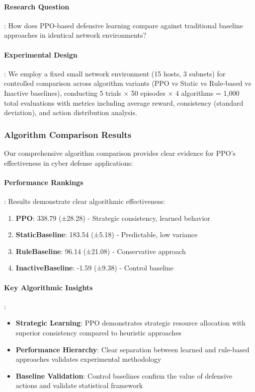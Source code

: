 \documentclass[12pt,oneside]{article}
\begin{document}
\paragraph{Research Question}: How does PPO-based defensive learning compare against traditional baseline approaches in identical network environments?

\paragraph{Experimental Design}: We employ a fixed small network environment (15 hosts, 3 subnets) for controlled comparison across algorithm variants (PPO vs Static vs Rule-based vs Inactive baselines), conducting 5 trials × 50 episodes × 4 algorithms = 1,000 total evaluations with metrics including average reward, consistency (standard deviation), and action distribution analysis.

\subsubsection{Algorithm Comparison Results}

Our comprehensive algorithm comparison provides clear evidence for PPO's effectiveness in cyber defense applications:

\paragraph{Performance Rankings}: Results demonstrate clear algorithmic effectiveness:
\begin{enumerate}
\item \textbf{PPO}: 338.79 (±28.28) - Strategic consistency, learned behavior  
\item \textbf{StaticBaseline}: 183.54 (±5.18) - Predictable, low variance
\item \textbf{RuleBaseline}: 96.14 (±21.08) - Conservative approach
\item \textbf{InactiveBaseline}: -1.59 (±9.38) - Control baseline
\end{enumerate}

\paragraph{Key Algorithmic Insights}:
\begin{itemize}
\item \textbf{Strategic Learning}: PPO demonstrates strategic resource allocation with superior consistency compared to heuristic approaches
\item \textbf{Performance Hierarchy}: Clear separation between learned and rule-based approaches validates experimental methodology
\item \textbf{Baseline Validation}: Control baselines confirm the value of defensive actions and validate statistical framework
\end{itemize}
\end{document}
